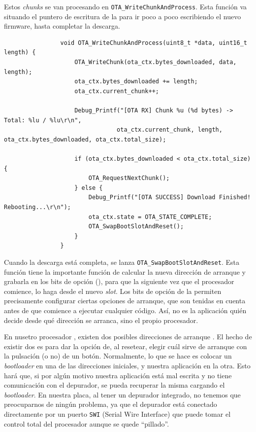 \documentclass[../main.tex]{subfiles}
\begin{document}
            Estos \emph{chunks} se van procesando en \texttt{OTA\_WriteChunkAndProcess}. Esta función va situando el puntero de escritura de la  para ir poco a poco escribiendo el nuevo firmware, hasta completar la descarga. 

            \begin{lstlisting}
                void OTA_WriteChunkAndProcess(uint8_t *data, uint16_t length) {
                    OTA_WriteChunk(ota_ctx.bytes_downloaded, data, length);
                    ota_ctx.bytes_downloaded += length;
                    ota_ctx.current_chunk++;

                    Debug_Printf("[OTA RX] Chunk %u (%d bytes) -> Total: %lu / %lu\r\n",
                                ota_ctx.current_chunk, length, ota_ctx.bytes_downloaded, ota_ctx.total_size);

                    if (ota_ctx.bytes_downloaded < ota_ctx.total_size) {
                        OTA_RequestNextChunk();
                    } else {
                        Debug_Printf("[OTA SUCCESS] Download Finished! Rebooting...\r\n");
                        ota_ctx.state = OTA_STATE_COMPLETE;
                        OTA_SwapBootSlotAndReset();
                    }
                }
            \end{lstlisting}

            Cuando la descarga está completa, se lanza \texttt{OTA\_SwapBootSlotAndReset}. Esta función tiene la importante función de calcular la nueva dirección de arranque y grabarla en los bits de opción (\REFMAN[3.4.1]), para que la siguiente vez que el procesador comience, lo haga desde el nuevo \emph{slot}. Los bits de opción de la  permiten precisamente configurar ciertas opciones de arranque, que son tenidas en cuenta antes de que comience a ejecutar cualquier código. Así, no es la aplicación quién decide desde qué dirección se arranca, sino el propio procesador.

            En nusetro procesador \MCU, existen dos posibles direcciones de arranque \REFMAN[3.7.7]. El hecho de existir dos es para dar la opción de, al resetear, elegir cuál sirve de arranque con la pulsación (o no) de un botón. Normalmente, lo que se hace es colocar un \emph{bootloader} en una de las direcciones iniciales, y nuestra aplicación en la otra. Esto hará que, si por algún motivo nuestra aplicación está mal escrita y no tiene comunicación con el depurador, se pueda recuperar la misma cargando el \emph{bootloader}. En nuestra placa, al tener un depurador integrado, no tenemos que preocuparnos de ningún problema, ya que el depurador está conectado directamente por un puerto \texttt{SWI} (Serial Wire Interface) que puede tomar el control total del procesador aunque se quede ``pillado''. 
\end{document}
